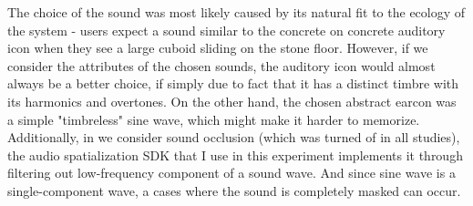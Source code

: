 The choice of the sound was most likely caused by its natural fit to the ecology of the system - users expect a sound similar to the concrete on concrete auditory icon when they see a large cuboid sliding on the stone floor. However, if we consider the attributes of the chosen sounds, the auditory icon would almost always be a better choice, if simply due to fact that it has a distinct timbre with its harmonics and overtones. On the other hand, the chosen abstract earcon was a simple "timbreless" sine wave, which might make it harder to memorize.
Additionally, in we consider sound occlusion (which was turned of in all studies), the audio spatialization SDK that I use in this experiment implements it through filtering out low-frequency component of a sound wave. And since sine wave is a single-component wave, a cases where the sound is completely masked can occur.

